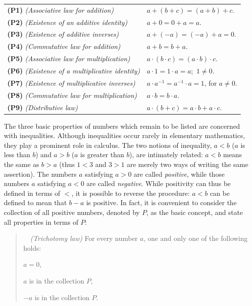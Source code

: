 \begin{center}
\renewcommand{\arraystretch}{1.4}
\begin{tabular}{@{}p{}p{}@{}}
\textbf{(P1)} \textit{(Associative law for addition)} & $a+(b+c)=(a+b)+c$.\\[0.4em]
\textbf{(P2)} \textit{(Existence of an additive identity)} & $a+0=0+a=a$.\\[0.4em]
\textbf{(P3)} \textit{(Existence of additive inverses)} & $a+(-a)=(-a)+a=0$.\\[0.4em]
\textbf{(P4)} \textit{(Commutative law for addition)} & $a+b=b+a$.\\[0.4em]
\textbf{(P5)} \textit{(Associative law for multiplication)} & $a\cdot(b\cdot c)=(a\cdot b)\cdot c$.\\[0.4em]
\textbf{(P6)} \textit{(Existence of a multiplicative identity)} & $a\cdot 1=1\cdot a=a$;\ $1\neq 0$.\\[0.4em]
\textbf{(P7)} \textit{(Existence of multiplicative inverses)} & $a\cdot a^{-1}=a^{-1}\cdot a=1$, for $a\neq 0$.\\[0.4em]
\textbf{(P8)} \textit{(Commutative law for multiplication)} & $a\cdot b=b\cdot a$.\\[0.4em]
\textbf{(P9)} \textit{(Distributive law)} & $a\cdot(b+c)=a\cdot b+a\cdot c$.
\end{tabular}
\end{center}

The three basic properties of numbers which remain to be listed are concerned
with inequalities. Although inequalities occur rarely in elementary
mathematics, they play a prominent role in calculus. The two notions of
inequality, $a<b$ ($a$ is less than $b$) and $a>b$ ($a$ is greater than $b$),
are intimately related: $a<b$ means the same as $b>a$ (thus $1<3$ and $3>1$
are merely two ways of writing the same assertion). The numbers $a$
satisfying $a>0$ are called \emph{positive}, while those numbers $a$
satisfying $a<0$ are called \emph{negative}. While positivity can thus be
defined in terms of $<$, it is possible to reverse the procedure: $a<b$ can
be defined to mean that $b-a$ is positive. In fact, it is convenient to
consider the collection of all positive numbers, denoted by $P$, as the basic
concept, and state all properties in terms of $P$:

\begin{quote}
\ \ \textit{(Trichotomy law)} For every number $a$, one and only
one of the following holds:
\begin{romans}
\item $a = 0$,
\item $a$ is in the collection $P$,
\item $-a$ is in the collection $P$.
\end{romans}
\end{quote}

